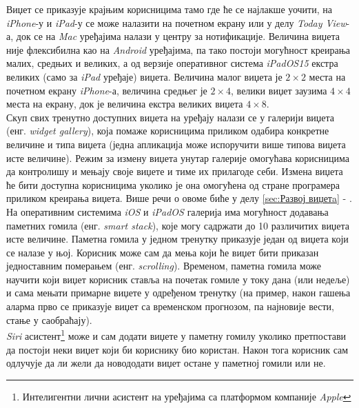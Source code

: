 \documentclass[12pt,oneside]{memoir}
\begin{document}
\indent Виџет се приказује крајњим корисницима тамо где ће се најлакше уочити, на \textit{iPhone}-у и \textit{iPad}-у се може налазити на почетном екрану или у делу \textit{Today View}-а, док се на \textit{Mac} уређајима налази у центру за нотификације. Величина виџета није флексибилна као на \textit{Android} уређајима, па тако постоји могућност креирања малих, средњих и великих, а од верзије оперативног система \textit{iPadOS15} екстра великих (само за \textit{iPad} уређаје) виџета. Величина малог виџета је $2 \times 2$ места на почетном екрану \textit{iPhone}-а, величина средњег је $2 \times 4$, велики виџет заузима $4 \times 4$ места на екрану, док је величина екстра великих виџета $4 \times 8$.
\\
\indent Скуп свих тренутно доступних виџета на уређају налази се у галерији виџета (енг. \textit{widget gallery}), која помаже корисницима приликом одабира конкретне величине и типа виџета (једна апликација може испоручити више типова виџета исте величине). Режим за измену виџета унутар галерије омогућава корисницима да контролишу и мењају своје виџете и тиме их прилагоде себи. Измена виџета ће бити доступна корисницима уколико је она омогућена од стране програмера приликом креирања виџета. Више речи о овоме биће у делу \ref{sec:Развој виџетa} - .
\\
\indent На оперативним системима \textit{iOS} и \textit{iPadOS} галерија има могућност додавања паметних гомила (енг. \textit{smart stack}), које могу садржати до 10 различитих виџета исте величине. Паметна гомила у једном тренутку приказује један од виџета који се налазе у њој. Корисник може сам да мења који ће виџет бити приказан једноставним померањем (енг. \textit{scrolling}). Временом, паметна гомила може научити који виџет корисник ставља на почетак гомиле у току дана (или недеље) и сама мењати примарне виџете у одређеном тренутку (на пример, након гашења аларма прво се приказује виџет са временском прогнозом, па најновије вести, стање у саобраћају).
\\
\indent \textit{Siri} асистент\footnote{Интелигентни лични асистент на уређајима са платформом компаније \textit{Apple}} може и сам додати виџете у паметну гомилу уколико претпостави да постоји неки виџет који би кориснику био користан. Након тога корисник сам одлучује да ли жели да новододати виџет остане у паметној гомили или не.
\end{document}
